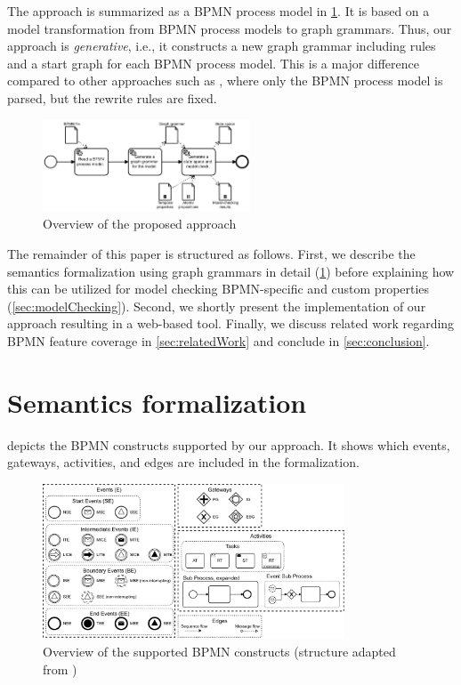 \documentclass[adraft, copyright, creativecommons]{eptcs} %
\begin{document}
The approach is summarized as a BPMN process model in \cref{fig:approach}.
It is based on a model transformation from BPMN process models to graph grammars.
Thus, our approach is \textit{generative}, i.e., it constructs a new graph grammar including rules and a start graph for each BPMN process model.
This is a major difference compared to other approaches such as \cite{corradiniFormalApproachAnalysis2021, vangorpVisualTokenbasedFormalization2013}, where only the BPMN process model is parsed, but the rewrite rules are fixed.

\begin{figure}[h]
    \centering
    \includegraphics[width=0.55\textwidth]{images/full-approach.pdf}
    \caption{Overview of the proposed approach}
    \label{fig:approach}
\end{figure}

The remainder of this paper is structured as follows.
First, we describe the semantics formalization using graph grammars in detail (\cref{sec:formalization}) before explaining how this can be utilized for model checking BPMN-specific and custom properties (\cref{sec:modelChecking}).
Second, we shortly present the implementation of our approach resulting in a web-based tool.
Finally, we discuss related work regarding BPMN feature coverage in \cref{sec:relatedWork} and conclude in \cref{sec:conclusion}.

\section{Semantics formalization} \label{sec:formalization}

 depicts the BPMN constructs supported by our approach.
It shows which events, gateways, activities, and edges are included in the formalization.

\begin{figure}[h]
    \centering
    \includegraphics[width=0.8\textwidth]{images/bpmn_semantics-feature_overview.pdf}
    \caption{Overview of the supported BPMN constructs (structure adapted from \cite{houhouFirstOrderLogicVerification2022})}
    \label{fig:bpmnConstructsOverview}
\end{figure}
\end{document}

